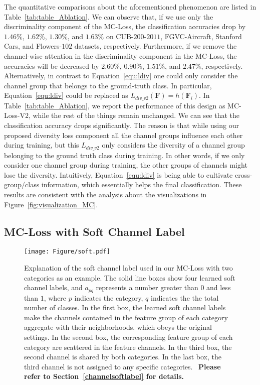 \documentclass[journal]{IEEEtran}
\begin{document}
The quantitative comparisons about the aforementioned phenomenon are listed in Table~\ref{tab:table_Ablation}. We can observe that, if we use only the discriminality component of the MC-Loss, the classification accuracies drop by $1.46\%$, $1.62\%$, $1.30\%$, and $1.63\%$ on CUB-$200$-$2011$, FGVC-Aircraft, Stanford Cars, and Flowers-$102$ datasets, respectively. Furthermore, if we remove the channel-wise attention in the discriminality component in the MC-Loss, the accuracies will be decreased by $2.60\%$, $0.90\%$, $1.51\%$, and $2.47\%$, respectively. Alternatively, in contrast to Equation~\ref{equ:ldiv} one could only consider the channel group that belongs to the ground-truth class. In particular, Equation~\ref{equ:ldiv} could be replaced as ${L}_{div\_v2}(\mathbf{F})=h(\mathbf{F}_i)$. In Table~\ref{tab:table_Ablation}, we report the performance of this design as MC-Loss-V$2$, while the rest of the things remain unchanged. We can see that the classification accuracy drops significantly. The reason is that while using our proposed diversity loss component all the channel groups influence each other during  training, but this ${L}_{div\_v2}$  only considers the diversity of a channel group belonging to the ground truth class during training. In other words, if we only consider one channel group during training, the other groups of channels might lose the diversity. Intuitively, Equation~\ref{equ:ldiv} is being able to cultivate cross-group/class information, which essentially helps the final classification. These results are consistent with the analysis about the visualizations in Figure~\ref{fig:visualization_MC}.






\subsection{MC-Loss with Soft Channel Label}\label{WMC}

\begin{figure}[!t]
  \begin{center}
    \texttt{[image: Figure/soft.pdf]}
  \end{center}
  \vspace{-5mm}
  \caption{Explanation of the soft channel label used in our MC-Loss with two categories as an example. The solid line boxes show four learned soft channel labels, and $a_{pq}$ represents a number greater than $0$ and less than $1$, where $p$ indicates the category,  $q$ indicates the the total number of classes. 
  In the first box, the learned soft channel labels make the channels contained in the feature group of each category aggregate with their neighborhoods, which obeys the original settings. 
  In the second box, the corresponding feature group of each category are scattered in the feature channels.
  In the third box, the second channel is shared by both categories.
  In the last box, the third channel is not assigned to any specific categories.
  ~\textbf{Please refer to Section~\ref{channelsoftlabel} for details.}
  }
  \label{fig:soft}
    \vspace{-5mm}
\end{figure}
\end{document}
